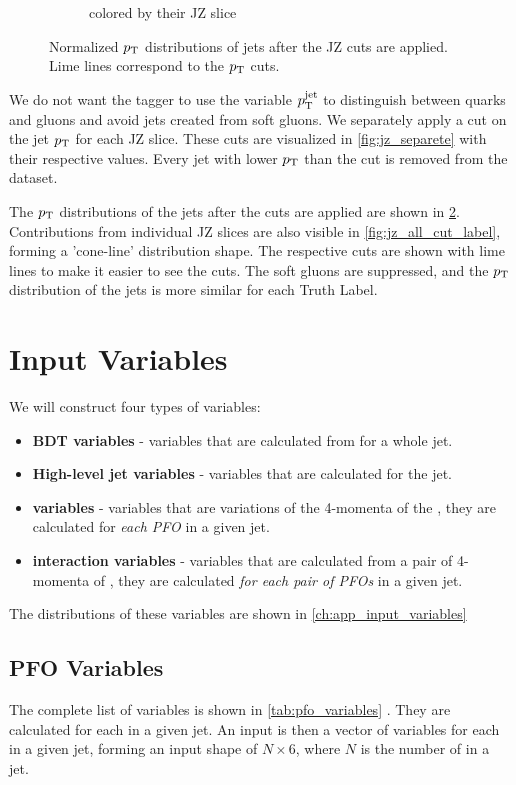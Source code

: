 \begin{figure}[htb]
\begin{subfigure}[t]{0.49\textwidth}
        \caption{colored by their JZ slice}
        \label{fig:jz_all_cut_jz}
    \end{subfigure}
    \caption{Normalized $p_\text{T}$ distributions of jets after the JZ cuts are applied. Lime lines correspond to the $p_\text{T}$ cuts.}
    \label{fig:jz_all_cut}
\end{figure}
We do not want the tagger to use the variable $p_\text{T}^{\text{jet}}$ to distinguish between quarks and gluons and avoid jets created from soft gluons.
We separately apply a cut on the jet $p_\text{T}$ for each JZ slice.
These cuts are visualized in \cref{fig:jz_separete} with their respective values.
Every jet with lower $p_\text{T}$ than the cut is removed from the dataset.

The $p_\text{T}$ distributions of the jets after the cuts are applied are shown in \cref{fig:jz_all_cut}.
Contributions from individual JZ slices are also visible in \cref{fig:jz_all_cut_label}, forming a 'cone-line' distribution shape.
The respective cuts are shown with lime lines to make it easier to see the cuts.
The soft gluons are suppressed, and the $p_\text{T}$ distribution of the jets is more similar for each Truth Label. 


\FloatBarrier
\section{Input Variables}
\label{sec:input_variables}
We will construct four types of variables:
\begin{itemize}
    \item \textbf{BDT variables} - variables that are calculated from \PFOs for a whole jet.
    \item \textbf{High-level jet variables} - variables that are calculated for the jet.
    \item \textbf{\PFO variables} - variables that are variations of the 4-momenta of the \PFOs, they are calculated for \emph{each PFO} in a given jet.
    \item \textbf{\PFO interaction variables} - variables that are calculated from a pair of 4-momenta of \PFO, they are calculated \emph{for each pair of PFOs} in a given jet.
\end{itemize}
The distributions of these variables are shown in \cref{ch:app_input_variables}

\subsection{PFO Variables}
\label{sec:pfo_variables}

The complete list of \PFO variables is shown in \cref{tab:pfo_variables} \cite{part}.
They are calculated for each \PFO in a given jet.
An input is then a vector of \PFO variables for each \PFO in a given jet, forming an input shape of $N \times 6$, where $N$ is the number of \PFOs in a jet.

